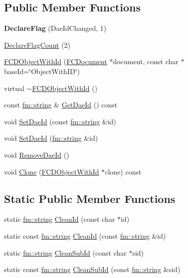 \subsection*{Public Member Functions}
\begin{DoxyCompactItemize}
\item 
\hypertarget{classFCDObjectWithId_a3ff3e2284f4206c968668b93fbc6322b}{
{\bfseries DeclareFlag} (DaeIdChanged, 1)}
\label{classFCDObjectWithId_a3ff3e2284f4206c968668b93fbc6322b}

\item 
\hyperlink{classFCDObjectWithId_a8289e2d57d75f2302effb07b0aee47f8}{DeclareFlagCount} (2)
\item 
\hyperlink{classFCDObjectWithId_a985fbb2e196c9fab8cbc2832be31ebab}{FCDObjectWithId} (\hyperlink{classFCDocument}{FCDocument} $\ast$document, const char $\ast$baseId=\char`\"{}ObjectWithID\char`\"{})
\item 
virtual \hyperlink{classFCDObjectWithId_a497c84442d6b3b608f24e99a6f89f82e}{$\sim$FCDObjectWithId} ()
\item 
const \hyperlink{classfm_1_1stringT}{fm::string} \& \hyperlink{classFCDObjectWithId_a6a166de3fb2c42cb165c385bbac6010a}{GetDaeId} () const 
\item 
void \hyperlink{classFCDObjectWithId_a73e750bac4c1c2675b14ecc763c166e7}{SetDaeId} (const \hyperlink{classfm_1_1stringT}{fm::string} \&id)
\item 
void \hyperlink{classFCDObjectWithId_a72e5e1e0f76d1516b833c854523508be}{SetDaeId} (\hyperlink{classfm_1_1stringT}{fm::string} \&id)
\item 
void \hyperlink{classFCDObjectWithId_a1075bd8450623f83343ce6a698da06e1}{RemoveDaeId} ()
\item 
void \hyperlink{classFCDObjectWithId_aea836eca56429cb5607903c2bf9ac111}{Clone} (\hyperlink{classFCDObjectWithId}{FCDObjectWithId} $\ast$clone) const 
\end{DoxyCompactItemize}
\subsection*{Static Public Member Functions}
\begin{DoxyCompactItemize}
\item 
static \hyperlink{classfm_1_1stringT}{fm::string} \hyperlink{classFCDObjectWithId_a1e96cc0d517ff2747ae1cee333098ff5}{CleanId} (const char $\ast$id)
\item 
static const \hyperlink{classfm_1_1stringT}{fm::string} \hyperlink{classFCDObjectWithId_acd7db6c71bf9bb396e1a5c751f1db0da}{CleanId} (const \hyperlink{classfm_1_1stringT}{fm::string} \&id)
\item 
static \hyperlink{classfm_1_1stringT}{fm::string} \hyperlink{classFCDObjectWithId_ae5ae1d23f25a57692524fbd36cf2caf4}{CleanSubId} (const char $\ast$sid)
\item 
static const \hyperlink{classfm_1_1stringT}{fm::string} \hyperlink{classFCDObjectWithId_a946857329e2db9a531a136784c870106}{CleanSubId} (const \hyperlink{classfm_1_1stringT}{fm::string} \&sid)
\end{DoxyCompactItemize}


